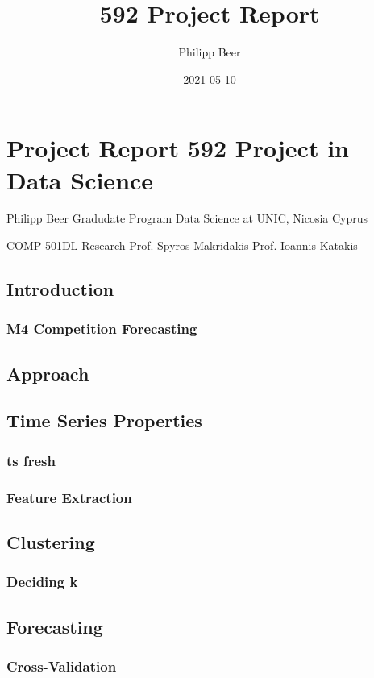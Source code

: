 \documentclass[11pt]{article}
\author{Philipp Beer}
\date{2021-05-10}
\title{592 Project Report}
\begin{document}
\maketitle


\section*{Project Report 592 Project in Data Science}
\label{sec:orgb3a03c7}
Philipp Beer
Gradudate Program Data Science at UNIC, Nicosia Cyprus

COMP-501DL Research 
Prof. Spyros Makridakis
Prof. Ioannis Katakis
\subsection*{Introduction}
\label{sec:org7698451}
\subsubsection*{M4 Competition Forecasting}
\label{sec:orgb90c57d}
\subsection*{Approach}
\label{sec:orge68be3e}
\subsection*{Time Series  Properties}
\label{sec:org1095d09}
\subsubsection*{ts fresh}
\label{sec:orgb505caf}
\subsubsection*{Feature Extraction}
\label{sec:orge6e2efd}
\subsection*{Clustering}
\label{sec:org3ffc334}
\subsubsection*{Deciding k}
\label{sec:org3667df5}
\subsection*{Forecasting}
\label{sec:org9d26251}
\subsubsection*{Cross-Validation}
\label{sec:orgf4ef268}
\end{document}
